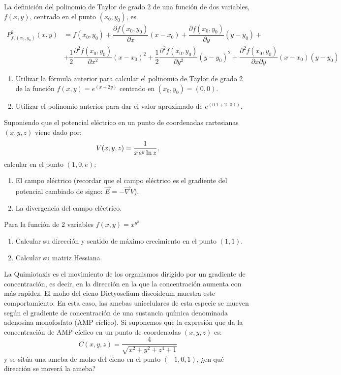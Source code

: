{La definición del polinomio de Taylor de grado 2 de una función de dos variables, $f(x,y)$, centrado en el punto $(x_{0},y_{0})$, es 
\begin{align*}
P_{f,(x_0,y_0)}^{2}(x,y)&= f(x_{0},y_{0})+\dfrac{\partial f(x_{0},y_{0})}{\partial x}(x-x_{0})+\dfrac{\partial f(x_{0},y_{0})}{\partial y}(y-y_{0})+\\
&+\dfrac{1}{2}\dfrac{\partial ^{2}f(x_{0},y_{0})}{\partial x^{2}}(x-x_{0})^{2}+\dfrac{1}{2}\dfrac{\partial ^{2}f(x_{0},y_{0})}{\partial y^{2}}(y-y_{0})^{2}+\dfrac{\partial ^{2}f(x_{0},y_{0})}{\partial x\partial y}(x-x_{0})(y-y_{0})
\end{align*}
\begin{enumerate}
\item  Utilizar la fórmula anterior para calcular el polinomio de Taylor de grado 2 de la función $f(x,y)=e^{(x+2y)}$ centrado en $(x_{0},y_{0})=(0,0)$.
\item  Utilizar el polinomio anterior para dar el valor aproximado de $e^{(0.1+2\cdot 0.1)}$.
\end{enumerate}
}


{Suponiendo que el potencial eléctrico en un punto de coordenadas cartesianas $(x,y,z)$ viene dado por:
\[
V(x,y,z) = \frac{1} {{x{\kern 1pt} e^y \ln z}},
\]
calcular en el punto $(1,0,e)$:
\begin{enumerate}
\item El campo eléctrico (recordar que el campo eléctrico es el gradiente del potencial cambiado de signo: $\vec E =  - \vec\nabla V$).
\item La divergencia del campo eléctrico.
\end{enumerate}
}


{Para la función de 2 variables $f(x,y) = x^{y^2}$
\begin{enumerate}
\item Calcular su dirección y sentido de máximo crecimiento en el punto $(1,1)$.
\item Calcular su matriz Hessiana.
\end{enumerate}
}


{La Quimiotaxis es el movimiento de los organismos dirigido por un gradiente de concentración, es decir, en la dirección
en la que la concentración aumenta con más rapidez. El moho del cieno Dictyoselium discoideum muestra este
comportamiento. En esta caso, las amebas unicelulares de esta especie se mueven según el gradiente de concentración de
una sustancia química denominada adenosina monofosfato (AMP cíclico). Si suponemos que la expresión que da la
concentración de AMP cíclico en un punto de coordenadas $(x,y,z)$ es:
\[
C(x,y,z) = \frac{4} {{\sqrt {x^2  + y^2  + z^4  + 1} }}
\]
y se sitúa una ameba de moho del cieno en el punto $(-1,0,1)$, ¿en qué dirección se moverá la ameba?
}



